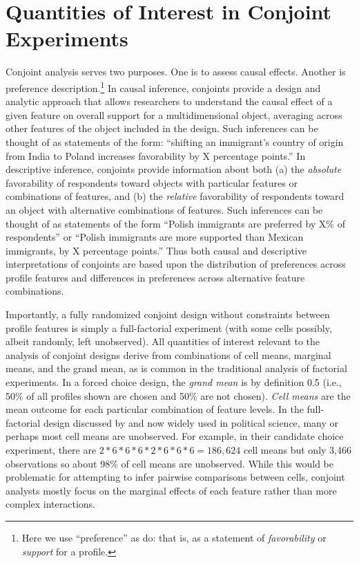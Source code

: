 \documentclass[a4paper,12pt]{article}\usepackage[]{graphicx}\usepackage[]{color}
\begin{document}
\section*{Quantities of Interest in Conjoint Experiments}\label{sec:quantities}

Conjoint analysis serves two purposes. One is to assess causal effects. Another is preference description.\footnote{Here we use ``preference'' as \citet{HainmuellerHopkinsYamamoto2014} do: that is, as a statement of \textit{favorability} or \textit{support} for a profile.} In causal inference, conjoints provide a design and analytic approach that allows researchers to understand the causal effect of a given feature on overall support for a multidimensional object, averaging across other features of the object included in the design. Such inferences can be thought of as statements of the form: ``shifting an immigrant's country of origin from India to Poland increases favorability by X percentage points.'' In descriptive inference, conjoints provide information about both (a) the \textit{absolute} favorability of respondents toward objects with particular features or combinations of features, and (b) the \textit{relative} favorability of respondents toward an object with alternative combinations of features. Such inferences can be thought of as statements of the form ``Polish immigrants are preferred by X\% of respondents'' or ``Polish immigrants are more supported than Mexican immigrants, by X percentage points.'' Thus both causal and descriptive interpretations of conjoints are based upon the distribution of preferences across profile features and differences in preferences across alternative feature combinations.

Importantly, a fully randomized conjoint design without constraints between profile features is simply a full-factorial experiment (with some cells possibly, albeit randomly, left unobserved). All quantities of interest relevant to the analysis of conjoint designs derive from combinations of cell means, marginal means, and the grand mean, as is common in the traditional analysis of factorial experiments. In a forced choice design, the \textit{grand mean} is by definition 0.5 (i.e., 50\% of all profiles shown are chosen and 50\% are not chosen). \textit{Cell means} are the mean outcome for each particular combination of feature levels. In the full-factorial design discussed by \citet{HainmuellerHopkinsYamamoto2014} and now widely used in political science, many or perhaps most cell means are unobserved. For example, in their candidate choice experiment, there are $2*6*6*6*2*6*6*6 = 186,624$ cell means but only 3,466 observations so about 98\% of cell means are unobserved. While this would be problematic for attempting to infer pairwise comparisons between cells, conjoint analysts mostly focus on the marginal effects of each feature rather than more complex interactions.
\end{document}
